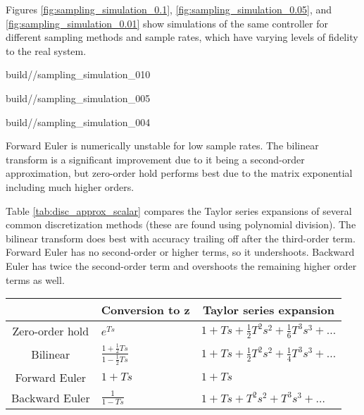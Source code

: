 Figures \ref{fig:sampling_simulation_0.1}, \ref{fig:sampling_simulation_0.05},
and \ref{fig:sampling_simulation_0.01} show simulations of the same controller
for different sampling methods and sample rates, which have varying levels of
fidelity to the real \gls{system}.
\begin{bookfigure}
  \begin{minisvg}{2}{build/\chapterpath/sampling_simulation_010}
    \caption{Sampling methods for system simulation with $T = 0.1$ s}
    \label{fig:sampling_simulation_0.1}
  \end{minisvg}
  \hfill
  \begin{minisvg}{2}{build/\chapterpath/sampling_simulation_005}
    \caption{Sampling methods for system simulation with $T = 0.05$ s}
    \label{fig:sampling_simulation_0.05}
  \end{minisvg}
  \hfill
  \begin{minisvg}{2}{build/\chapterpath/sampling_simulation_004}
    \caption{Sampling methods for system simulation with $T = 0.01$ s}
    \label{fig:sampling_simulation_0.01}
  \end{minisvg}
\end{bookfigure}

Forward Euler is numerically unstable for low sample rates. The bilinear
transform is a significant improvement due to it being a second-order
approximation, but zero-order hold performs best due to the matrix exponential
including much higher orders.

Table \ref{tab:disc_approx_scalar} compares the Taylor series expansions of
several common discretization methods (these are found using polynomial
division). The bilinear transform does best with accuracy trailing off after the
third-order term. Forward Euler has no second-order or higher terms, so it
undershoots. Backward Euler has twice the second-order term and overshoots the
remaining higher order terms as well.
\begin{booktable}
  \begin{tabular}{|cll|}
    \hline
    \rowcolor{headingbg}
    \multicolumn{1}{|c}{\textbf{Method}} &
      \multicolumn{1}{c}{\textbf{Conversion to z}} &
      \multicolumn{1}{c|}{\textbf{Taylor series expansion}} \\
    \hline
    Zero-order hold &
      $e^{Ts}$ &
      $1 + Ts + \frac{1}{2}T^2s^2 + \frac{1}{6}T^3s^3 + \ldots$ \\
    Bilinear &
      $\frac{1 + \frac{1}{2}Ts}{1 - \frac{1}{2}Ts}$ &
      $1 + Ts + \frac{1}{2}T^2s^2 + \frac{1}{4}T^3s^3 + \ldots$ \\
    Forward Euler &
      $1 + Ts$ &
      $1 + Ts$ \\
    Backward Euler &
      $\frac{1}{1 - Ts}$ &
      $1 + Ts + T^2s^2 + T^3s^3 + \ldots$ \\
    \hline
  \end{tabular}
  \caption{Taylor series expansions of discretization methods (scalar case). The
    zero-order hold discretization method is exact.}
  \label{tab:disc_approx_scalar}
\end{booktable}
